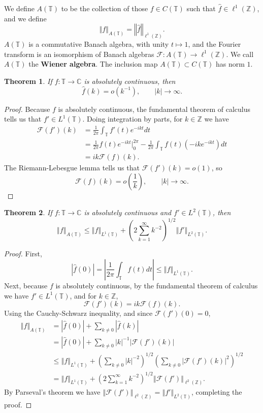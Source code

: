\documentclass{article}
\newcommand{\norm}[1]{\left\Vert #1 \right\Vert}
\newtheorem{theorem}{Theorem}
\theoremstyle{definition}
\begin{document}
We define $A(\mathbb{T})$ to be the collection of those $f \in C(\mathbb{T})$ such that
$\hat{f} \in \ell^1(\mathbb{Z})$, and we define
\[
\norm{f}_{A(\mathbb{T})} = \norm{\hat{f}}_{\ell^1(\mathbb{Z})}.
\]
$A(\mathbb{T})$ is a commutative Banach algebra, with unity $t \mapsto 1$, and
the Fourier transform is an isomorphism of Banach algebras
$\mathscr{F}:A(\mathbb{T}) \to \ell^1(\mathbb{Z})$. 
We call $A(\mathbb{T})$ the \textbf{Wiener algebra}. The inclusion map $A(\mathbb{T}) \subset C(\mathbb{T})$
has  norm $1$. 

\begin{theorem}
If $f:\mathbb{T} \to \mathbb{C}$ is absolutely continuous, then
\[
\hat{f}(k) = o(k^{-1}), \qquad |k| \to \infty.
\]
\end{theorem}
\begin{proof}
Because $f$ is absolutely continuous, the fundamental theorem of calculus tells us that
$f' \in L^1(\mathbb{T})$.
Doing integration by parts, for  $k \in \mathbb{Z}$ we have
\begin{align*}
\mathscr{F}(f')(k)& = \frac{1}{2\pi} \int_{\mathbb{T}} f'(t) e^{-ikt} dt\\
&=\frac{1}{2\pi} f(t) e^{-ikt} \Big|_0^{2\pi} - \frac{1}{2\pi} \int_{\mathbb{T}} f(t) (-ik e^{-ikt}) dt\\
&=ik \mathscr{F}(f)(k).
\end{align*}
The Riemann-Lebesgue lemma tells us that $\mathscr{F}(f')(k)=o(1)$, so
\[
\mathscr{F}(f)(k) = o\left(\frac{1}{k}\right), \qquad |k| \to \infty.
\]
\end{proof}


\begin{theorem}
If $f:\mathbb{T} \to \mathbb{C}$ is absolutely continuous and $f' \in L^2(\mathbb{T})$,
then
\[
\norm{f}_{A(\mathbb{T})} \leq \norm{f}_{L^1(\mathbb{T})} +
\left(2 \sum_{k=1}^\infty k^{-2} \right)^{1/2} \norm{f'}_{L^2(\mathbb{T})}.
\]
\end{theorem}
\begin{proof}
First,
\[
|\hat{f}(0)| = \left| \frac{1}{2\pi} \int_{\mathbb{T}} f(t) dt \right|
\leq \norm{f}_{L^1(\mathbb{T})}.
\]
Next, because $f$ is absolutely continuous, by the fundamental theorem of calculus we have
$f' \in L^1(\mathbb{T})$, and  for $k \in \mathbb{Z}$,
\[
\mathscr{F}(f')(k)=ik \mathscr{F}(f)(k).
\]
Using the Cauchy-Schwarz inequality, and since $\mathscr{F}(f')(0)=0$,
\begin{align*}
\norm{f}_{A(\mathbb{T})}&=|\hat{f}(0)|+\sum_{k \neq 0} |\hat{f}(k)|\\
&=|\hat{f}(0)|+\sum_{k \neq 0} |k|^{-1} |\mathscr{F}(f')(k)|\\
&\leq \norm{f}_{L^1(\mathbb{T})} + \left( \sum_{k \neq 0} |k|^{-2} \right)^{1/2} \left( \sum_{k \neq 0} |\mathscr{F}(f')(k)|^2 \right)^{1/2}\\
&=  \norm{f}_{L^1(\mathbb{T})} + \left( 2 \sum_{k=1}^\infty k^{-2} \right)^{1/2}
\norm{\mathscr{F}(f')}_{\ell^2(\mathbb{Z})}.
\end{align*}
By Parseval's theorem we have
$\norm{\mathscr{F}(f')}_{\ell^2(\mathbb{Z})}=\norm{f'}_{L^2(\mathbb{T})}$, completing the proof.
\end{proof}
\end{document}
